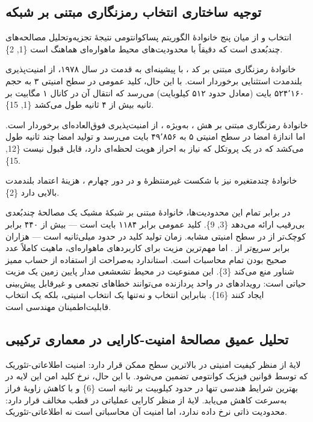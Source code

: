 \documentclass[a4paper,14pt]{extreport}
\begin{document}
\subsection{توجیه ساختاری انتخاب رمزنگاری مبتنی بر شبکه}

انتخاب  و  از میان پنج خانوادهٔ الگوریتم پساکوانتومی نتیجهٔ تجزیه‌وتحلیل مصالحه‌های چندبُعدی است که دقیقاً با محدودیت‌های محیط ماهواره‌ای هماهنگ است \{1, 2\}.

خانوادهٔ رمزنگاری مبتنی بر کد ، با پیشینه‌ای به قدمت  در سال ۱۹۷۸، از امنیت‌پذیری بلندمدت استثنایی برخوردار است. با این حال، کلید عمومی  در سطح امنیتی ۳ به حجم ۵۲۴٬۱۶۰ بایت (معادل حدود ۵۱۲ کیلوبایت) می‌رسد که انتقال آن در کانال ۱ مگابیت بر ثانیه بیش از ۴ ثانیه طول می‌کشد \{1, 15\}.

خانوادهٔ رمزنگاری مبتنی بر هش ، به‌ویژه ، از امنیت‌پذیری فوق‌العاده‌ای برخوردار است. اما اندازهٔ امضا در سطح امنیتی ۵ به ۴۹٬۸۵۶ بایت می‌رسد و تولید امضا چند ثانیه طول می‌کشد که در یک پروتکل  که نیاز به احراز هویت لحظه‌ای دارد، قابل قبول نیست \{12, 15\}.

خانوادهٔ چندمتغیره  نیز با شکست غیرمنتظرهٔ  و  در دور چهارم ، هزینهٔ اعتماد بلندمدت بالایی دارد \{2\}.

در برابر تمام این محدودیت‌ها، خانوادهٔ مبتنی بر شبکهٔ مشبک  یک مصالحهٔ چندبُعدی بی‌رقیب ارائه می‌دهد \{3, 9\}. کلید عمومی  برابر ۱۱۸۴ بایت است --- بیش از ۴۴۰ برابر کوچک‌تر از  در سطح امنیتی مشابه. زمان تولید کلید در حدود  میلی‌ثانیه است --- هزاران برابر سریع‌تر از . اما مهم‌ترین مزیت برای کاربردهای ماهواره‌ای، ماهیت کاملاً عدد صحیح  بودن تمام محاسبات است. استاندارد  به‌صراحت از استفاده از حساب ممیز شناور  منع می‌کند \{3\}. این ممنوعیت در محیط تشعشعی مدار پایین زمین یک مزیت حیاتی است: رویدادهای  در واحد  پردازنده می‌توانند خطاهای تجمعی و غیرقابل پیش‌بینی ایجاد کنند \{16\}. بنابراین انتخاب  و  نه‌تنها یک انتخاب امنیتی، بلکه یک انتخاب قابلیت‌اطمینان  مهندسی است.

\subsection{تحلیل عمیق مصالحهٔ امنیت-کارایی در معماری ترکیبی}

لایهٔ  از منظر کیفیت امنیتی در بالاترین سطح ممکن قرار دارد: امنیت اطلاعاتی-تئوریک که توسط قوانین فیزیک کوانتومی تضمین می‌شود. با این حال، نرخ کلید امن این لایه در بهترین شرایط هندسی تنها در حدود  کیلوبیت بر ثانیه است \{6\} و با کاهش زاویهٔ فراز به‌سرعت کاهش می‌یابد. لایهٔ  از منظر کارایی عملیاتی در قطب مخالف قرار دارد: محدودیت ذاتی نرخ داده ندارد، اما امنیت آن محاسباتی است نه اطلاعاتی-تئوریک.
\end{document}
